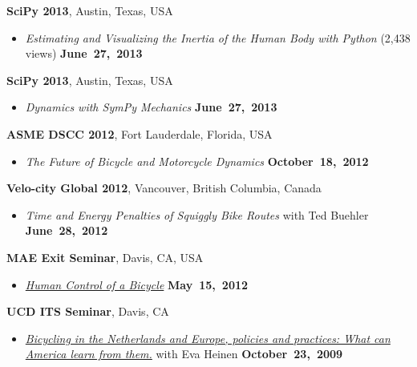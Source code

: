 \documentclass[10pt]{article}
\newenvironment{outerlist}[1][\enskip\textbullet]%
        {\begin{itemize}[#1]}{\end{itemize}%
         \vspace{-.6\baselineskip}}
\newcommand{\blankline}{\quad\pagebreak[2]}
\begin{document}
\blankline

\textbf{SciPy 2013}, Austin, Texas, USA
\begin{outerlist}
  \item[] \textit{Estimating and Visualizing the Inertia of the Human Body with
    Python} (2,438 views)
    \hfill \textbf{June~27,~2013}
\end{outerlist}

\blankline

\textbf{SciPy 2013}, Austin, Texas, USA
\begin{outerlist}
  \item[] \textit{Dynamics with SymPy Mechanics}
    \hfill \textbf{June~27,~2013}
\end{outerlist}

\blankline

\textbf{ASME DSCC 2012}, Fort Lauderdale, Florida, USA
\begin{outerlist}
  \item[] \textit{The Future of Bicycle and Motorcycle Dynamics}
    \hfill \textbf{October~18,~2012}
\end{outerlist}

\blankline

\textbf{Velo-city Global 2012}, Vancouver, British Columbia, Canada
\begin{outerlist}
  \item[] \textit{Time and Energy Penalties of Squiggly Bike Routes} with Ted
    Buehler
  \hfill \textbf{June~28,~2012}
\end{outerlist}

\blankline

\textbf{MAE Exit Seminar}, Davis, CA, USA
\begin{outerlist}
  \item[] \textit{\href{http://youtu.be/oKbaHCGK94E}{Human Control of a
    Bicycle}}
  \hfill \textbf{May~15,~2012}
\end{outerlist}

\blankline

\textbf{UCD ITS Seminar}, Davis, CA
\begin{outerlist}
\item[]
  \textit{\href{http://www.its.ucdavis.edu/?seminar=october-23-2009}{Bicycling
    in the Netherlands and Europe, policies and practices: What can America
    learn from them.}} with Eva Heinen
    \hfill \textbf{October~23,~2009}
\end{outerlist}

\blankline
\end{document}
